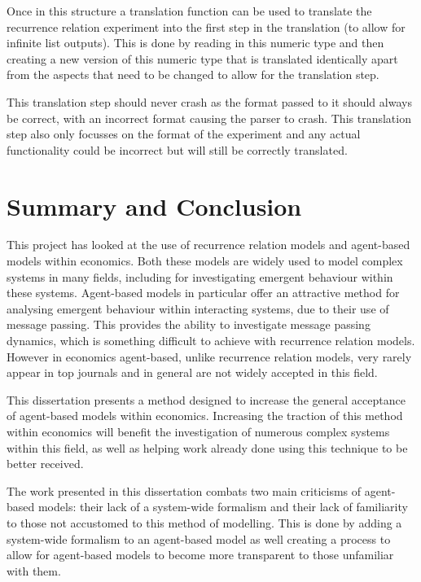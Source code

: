 \documentclass{article}
\begin{document}
Once in this structure a translation function can be used to translate the recurrence relation experiment into the first step in the translation (to allow for infinite list outputs). This is done by reading in this numeric type and then creating a new version of this numeric type that is translated identically apart from the aspects that need to be changed to allow for the translation step. 

This translation step should never crash as the format passed to it should always be correct, with an incorrect format causing the parser to crash. This translation step also only focusses on the format of the experiment and any actual functionality could be incorrect but will still be correctly translated. 




\newpage
\section{Summary and Conclusion }
This project has looked at the use of recurrence relation models and agent-based models within economics. Both these models are widely used to model complex systems in many fields, including for investigating emergent behaviour within these systems. Agent-based models in particular offer an attractive method for analysing emergent behaviour within interacting systems, due to their use of message passing. This provides the ability to investigate message passing dynamics, which is something difficult to achieve with recurrence relation models. However in economics agent-based, unlike recurrence relation models, very rarely appear in top journals and in general are not widely accepted in this field.     

This dissertation presents a method designed to increase the general acceptance of agent-based models within economics. Increasing the traction of this method within economics will benefit the investigation of numerous complex systems within this field, as well as helping work already done using this technique to be better received. 

The work presented in this dissertation combats two main criticisms of agent-based models: their lack of a system-wide formalism and their lack of familiarity to those not accustomed to this method of modelling. This is done by adding a system-wide formalism to an agent-based model as well creating a process to allow for agent-based models to become more transparent to those unfamiliar with them.
\end{document}
